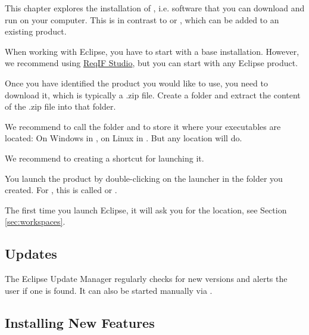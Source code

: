This chapter explores the installation of , i.e. software that you can download and run on your computer.  This is in contrast to  or , which can be added to an existing product.

When working with Eclipse, you have to start with a base installation.  However, we recommend using \href{https://reqif.academy}{ReqIF Studio}, but you can start with any Eclipse product.

Once you have identified the product you would like to use, you need to download it, which is typically a .zip file.  Create a folder and extract the content of the .zip file into that folder.

\begin{info}
We recommend to call the folder  and to store it where your executables are located: On Windows in , on Linux in .  But any location will do.

We recommend to creating a shortcut for launching it.
\end{info}

You launch the product by double-clicking on the launcher in the folder you created.  For \pror{}, this is called  or .

The first time you launch Eclipse, it will ask you for the  location, see Section \ref{sec:workspaces}.

\subsection{Updates}
\label{sec:update}

The Eclipse Update Manager regularly checks for new versions and alerts the user if one is found.  It can also be started manually via .

\subsection{Installing New Features}
\label{sec:install-add-on}

